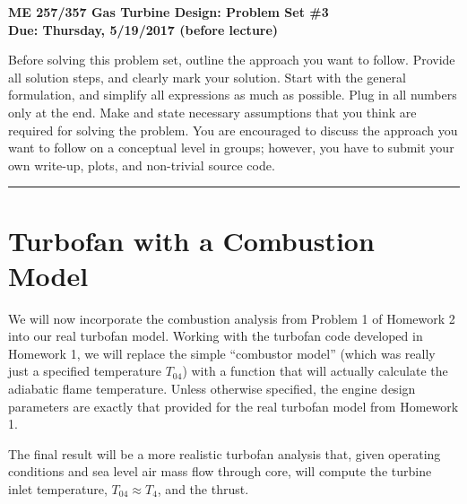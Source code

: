 \documentclass[11pt]{article}
\def\hwnum{3}
\begin{document}
\begin{center}
{\Large\bf ME 257/357 Gas Turbine Design: Problem Set \#\hwnum\\
       Due: Thursday, 5/19/2017 (before lecture)}
\end{center}

Before solving this problem set, outline the approach you want to follow. Provide all solution steps, and clearly mark your solution. Start with the general formulation, and simplify all expressions as much as possible. Plug in all numbers only at the end. Make and state necessary assumptions that you
think are required for solving the problem. You are encouraged to discuss the approach you want to follow on a conceptual level in groups; however, you have to submit your own write-up, plots, and non-trivial source code.
\\
\hrule
\vspace{2mm}
\noindent
\section{Turbofan with a Combustion Model}

We will now incorporate the combustion analysis from Problem 1 of Homework 2 into our real turbofan model. Working with the turbofan code developed in Homework 1, we will replace the simple ``combustor model” (which was really just a specified temperature $T_{04}$) with a function that will actually calculate the adiabatic flame temperature. Unless otherwise specified, the engine design parameters are exactly that provided for the real turbofan model from Homework 1.

The final result will be a more realistic turbofan analysis that, given operating conditions and sea level air mass flow through core, will compute the turbine inlet temperature, $T_{04}\approx T_{4}$, and the thrust.
\end{document}
